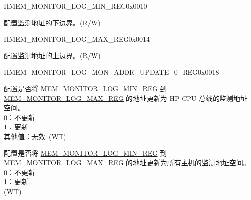 \begin{register}{H}{MEM\_MONITOR\_LOG\_MIN\_REG}{0x0010}\label{regdesc:MEMMONITORLOGMINREG}
%
\regnewline%
\begin{regdesc}\begin{reglist}
\label{fielddesc:MEMMONITORLOGMIN}\item [MEM\_MONITOR\_LOG\_MIN] 配置监测地址的下边界。(R/W)
\end{reglist}\end{regdesc}
\end{register}


\begin{register}{H}{MEM\_MONITOR\_LOG\_MAX\_REG}{0x0014}\label{regdesc:MEMMONITORLOGMAXREG}
%
\regnewline%
\begin{regdesc}\begin{reglist}
\label{fielddesc:MEMMONITORLOGMAX}\item [MEM\_MONITOR\_LOG\_MAX] 配置监测地址的上边界。(R/W)
\end{reglist}\end{regdesc}
\end{register}


\begin{register}{H}{MEM\_MONITOR\_LOG\_MON\_ADDR\_UPDATE\_0\_REG}{0x0018}\label{regdesc:MEMMONITORLOGMONADDRUPDATE0REG}
%
%
%
\regnewline%
\begin{regdesc}\begin{reglist}
\label{fielddesc:MEMMONITORLOGMONADDRCOREUPDATE}\item [MEM\_MONITOR\_LOG\_MON\_ADDR\_CORE\_UPDATE] 配置是否将 \hyperref[regdesc:MEMMONITORLOGMINREG]{MEM\_MONITOR\_LOG\_MIN\_REG} 到 \hyperref[regdesc:MEMMONITORLOGMAXREG]{MEM\_MONITOR\_LOG\_MAX\_REG} 的地址更新为 HP CPU 总线的监测地址空间。 \\
0：不更新\\
1：更新\\
其他值：无效\ (WT)
\label{fielddesc:MEMMONITORLOGMONADDRALLUPDATE}\item [MEM\_MONITOR\_LOG\_MON\_ADDR\_ALL\_UPDATE] 配置是否将 \hyperref[regdesc:MEMMONITORLOGMINREG]{MEM\_MONITOR\_LOG\_MIN\_REG} 到 \hyperref[regdesc:MEMMONITORLOGMAXREG]{MEM\_MONITOR\_LOG\_MAX\_REG} 的地址更新为所有主机的监测地址空间。\\
0：不更新\\
1：更新\\ (WT)
\end{reglist}\end{regdesc}
\end{register}


